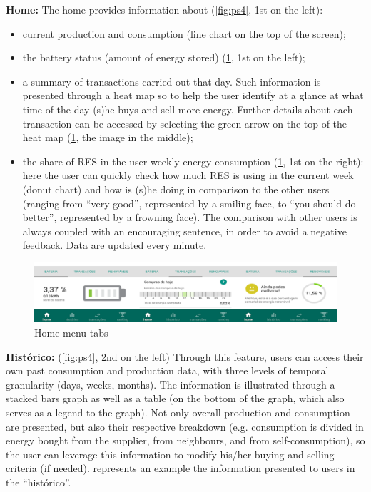 \textbf{Home:}
The home provides information about (\cref{fig:ps4}, 1st on the left):
\begin{itemize}
    \item current production and consumption (line chart on the top of the screen);
    \item the battery status (amount of energy stored) (\cref{fig:ps5}, 1st on the left);
    \item a summary of transactions carried out that day. Such information is presented through a heat map so to help the user identify at a glance at what time of the day (s)he buys and sell more energy. Further details about each transaction can be accessed by selecting the green arrow on the top of the heat map (\cref{fig:ps5}, the image in the middle);
    \item the share of RES in the user weekly energy consumption (\cref{fig:ps5}, 1st on the right): here the user can quickly check how much RES is using in the current week (donut chart) and how is (s)he doing in comparison to the other users (ranging from “very good”, represented by a smiling face, to “you should do better”, represented by a frowning face). The comparison with other users is always coupled with an encouraging sentence, in order to avoid a negative feedback. Data are updated every minute.
\end{itemize}

\begin{figure}[h]
\centering
\includegraphics[width=1\textwidth]{./Images/ps5}
\caption{Home menu tabs}
\label{fig:ps5}
\end{figure}
\textbf{Histórico:} (\cref{fig:ps4}, 2nd on the left)
Through this feature, users can access their own past consumption and production data, with three levels of temporal granularity (days, weeks, months). The information is illustrated through a stacked bars graph as well as a table (on the bottom of the graph, which also serves as a legend to the graph). Not only overall production and consumption are presented, but also their respective breakdown (e.g. consumption is divided in energy bought from the supplier, from neighbours, and from self-consumption), so the user can leverage this information to modify his/her buying and selling criteria (if needed).
 represents an example the information presented to users in the “histórico”.

